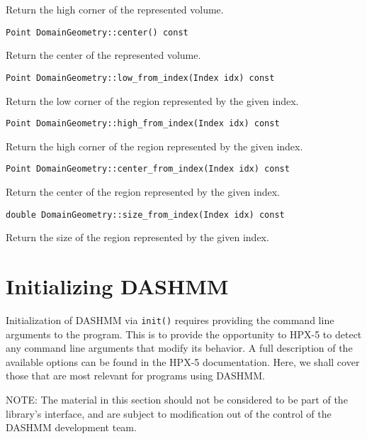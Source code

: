 \noindent Return the high corner of the represented volume.\\

\begin{lstlisting}
Point DomainGeometry::center() const
\end{lstlisting}

\noindent Return the center of the represented volume.

\begin{lstlisting}
Point DomainGeometry::low_from_index(Index idx) const
\end{lstlisting}

\noindent Return the low corner of the region represented by the given index.

\begin{lstlisting}
Point DomainGeometry::high_from_index(Index idx) const
\end{lstlisting}

\noindent Return the high corner of the region represented by the given index.

\begin{lstlisting}
Point DomainGeometry::center_from_index(Index idx) const
\end{lstlisting}

\noindent Return the center of the region represented by the given index.

\begin{lstlisting}
double DomainGeometry::size_from_index(Index idx) const
\end{lstlisting}

\noindent Return the size of the region represented by the given index.



\section{Initializing DASHMM}

Initialization of DASHMM via \texttt{init()} requires providing the command
line arguments to the program. This is to provide the opportunity to HPX-5 to
detect any command line arguments that modify its behavior. A full description
of the available options can be found in the HPX-5 documentation. Here, we
shall cover those that are most relevant for programs using DASHMM.

NOTE: The material in this section should not be considered to be part of the
library's interface, and are subject to modification out of the control of
the DASHMM development team.

